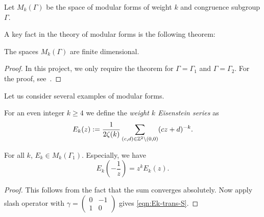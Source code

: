 \begin{definition}\label{def:Mk}\leanok
    Let $M_k(\Gamma)$ be the space of modular forms of weight $k$ and congruence subgroup $\Gamma$.
\end{definition}

A key fact in the theory of modular forms is the following theorem:
\begin{theorem}\label{theorem-Mk-finite-dimensional}
    The spaces $M_k(\Gamma)$ are finite dimensional.
\end{theorem}
\begin{proof}
  In this project, we only require the theorem for $\Gamma = \Gamma_1$ and $\Gamma = \Gamma_2$. For the proof, see~\cite{Serre73}.
\end{proof}

Let us consider several examples of modular forms.
\begin{definition}\label{def:Ek-definition}%
For an even integer $k\geq 4$ we define the \emph{weight $k$ Eisenstein series} as
\begin{equation}\label{eqn:Ek-definition}
E_k(z):=\frac{1}{2\zeta(k)}\sum_{(c,d)\in\mathbb{Z}^2\backslash(0,0)}(cz+d)^{-k}.\end{equation}
\end{definition}
\begin{lemma}\label{lemma:Ek-is-modular-form}
For all $k$, $E_k\in M_k(\Gamma_1)$.
Especially, we have
\begin{equation}\label{eqn:Ek-trans-S}
    E_k \left(-\frac{1}{z}\right) = z^k E_k(z).
\end{equation}
\end{lemma}
\begin{proof}
This follows from the fact that the sum converges absolutely.
Now apply slash operator with $\gamma = \left(\begin{smallmatrix} 0 & -1 \\ 1 & 0 \end{smallmatrix}\right)$ gives \eqref{eqn:Ek-trans-S}.
\end{proof}

